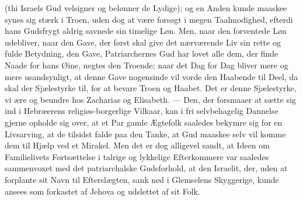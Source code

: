 \documentclass[12pt,a4paper]{book}
\begin{document}
(thi Israels Gud velsigner og belønner de Lydige); og en Anden
kunde maaskee synes sig stærk i Troen, uden dog at være forsøgt i
megen Taalmodighed, efterdi hans Gudsfrygt aldrig savnede sin
timelige Løn. Men, naar den forventede Løn udebliver, naar den
Gave, der først skal give det nærværende Liv sin rette og fulde
Betydning, den Gave, Patriarchernes Gud har lovet alle dem, der
finde Naade for hans Øine, negtes den Troende; naar det Dag for
Dag bliver mere og mere usandsynligt, at denne Gave nogensinde vil
vorde den Haabende til Deel, da skal der Sjælestyrke til, for at
bevare Troen og Haabet. Det er denne Sjælestyrke, vi ære og
beundre hos Zacharias og Elisabeth. --- Den, der forsmaaer at
sætte sig ind i Hebræerens religiøs-borgerlige Vilkaar, kan i fri
selvbehagelig Dannelse gjerne opholde sig over, at et Par gamle
Ægtefolk saaledes bekymre sig for en Livsarving, at de tilsidst
falde paa den Tanke, at Gud maaskee selv vil komme dem til Hjælp
ved et Mirakel. Men det er dog alligevel sandt, at Ideen om
Familielivets Fortsættelse i talrige og lykkelige Efterkommere var
saaledes sammenvoxet med det patriarchalske Gudsforhold, at
den Israelit, der, uden at forplante sit Navn til Efterslægten,
sank ned i Glemselens Skyggerige, kunde ansees som forkastet af
Jehova og udslettet af sit Folk.
\end{document}
